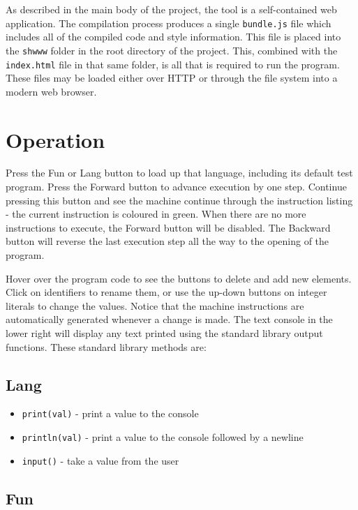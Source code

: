 \documentclass[12pt,a4paper]{report}
\begin{document}
As described in the main body of the project, the tool is a self-contained web application. The compilation process produces a single \verb+bundle.js+ file which includes all of the compiled code and style information. This file is placed into the \verb+shwww+ folder in the root directory of the project. This, combined with the \verb+index.html+ file in that same folder, is all that is required to run the program. These files may be loaded either over HTTP or through the file system into a modern web browser.

\section{Operation}

Press the Fun or Lang button to load up that language, including its default test program. Press the Forward button to advance execution by one step. Continue pressing this button and see the machine continue through the instruction listing - the current instruction is coloured in green. When there are no more instructions to execute, the Forward button will be disabled. The Backward button will reverse the last execution step all the way to the opening of the program.

Hover over the program code to see the buttons to delete and add new elements. Click on identifiers to rename them, or use the up-down buttons on integer literals to change the values. Notice that the machine instructions are automatically generated whenever a change is made. The text console in the lower right will display any text printed using the standard library output functions. These standard library methods are:

\subsection{Lang}

\begin{itemize}
\item \verb+print(val)+ - print a value to the console
\item \verb+println(val)+ - print a value to the console followed by a newline
\item \verb+input()+ - take a value from the user
\end{itemize}


\subsection{Fun}
\end{document}
